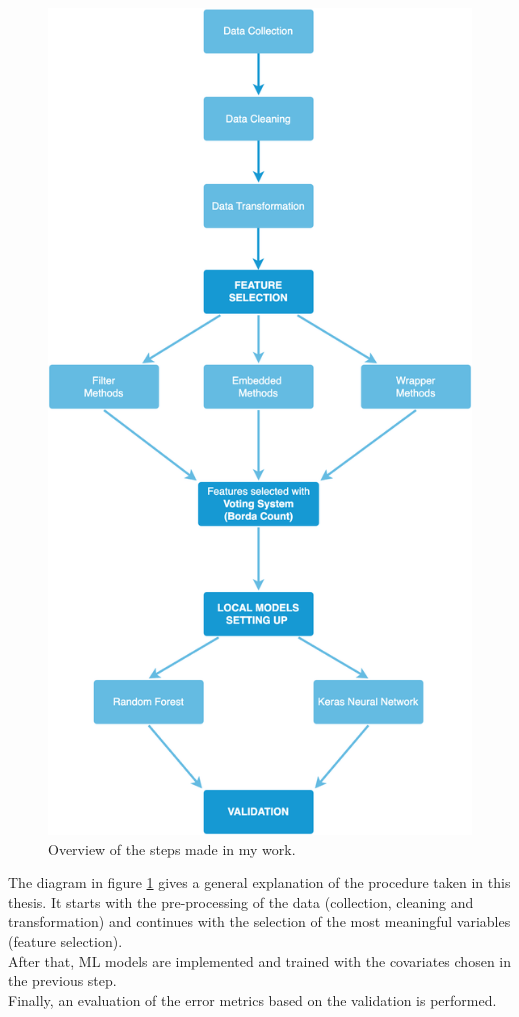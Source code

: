 \begin{figure}[H]
    \centering
    \includegraphics[scale=0.21]{images/overview.png}
    \caption{Overview of the steps made in my work.}
    \label{fig:overview}
\end{figure}

The diagram in figure \ref{fig:overview} gives a general explanation of the procedure taken in this thesis. It starts with the pre-processing of the data (collection, cleaning and transformation) and continues with the selection of the most meaningful variables (feature selection). \\
After that, ML models are implemented and trained with the covariates chosen in the previous step. \\
Finally, an evaluation of the error metrics based on the validation is performed.
